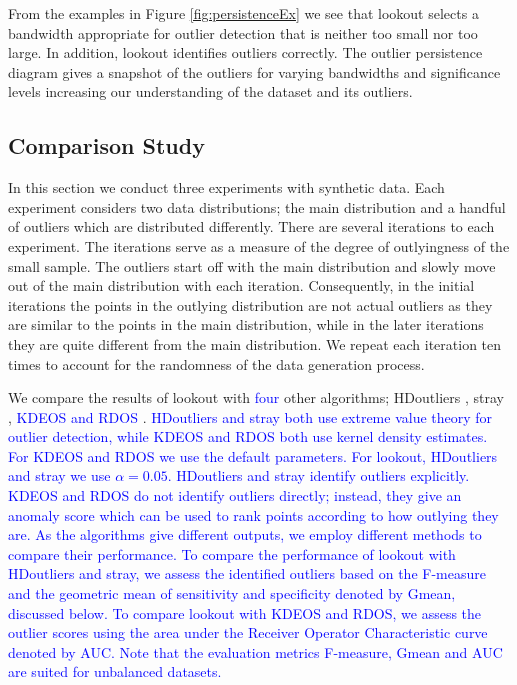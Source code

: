 \documentclass[12pt]{article}
\theoremstyle{definition}
\theoremstyle{definition}
\theoremstyle{definition}
\theoremstyle{definition}
\theoremstyle{remark}
\begin{document}
From the examples in Figure \ref{fig:persistenceEx} we see that lookout selects a bandwidth appropriate for outlier detection that is neither too small nor too large. In addition, lookout identifies outliers correctly. The outlier persistence diagram gives a snapshot of the outliers for varying bandwidths and significance levels increasing our understanding of the dataset and its outliers.

\hypertarget{sec:SyntheticComparison}{%
\subsection{Comparison Study}\label{sec:SyntheticComparison}}

In this section we conduct three experiments with synthetic data. Each experiment considers two data distributions; the main distribution and a handful of outliers which are distributed differently. There are several iterations to each experiment. The iterations serve as a measure of the degree of outlyingness of the small sample. The outliers start off with the main distribution and slowly move out of the main distribution with each iteration. Consequently, in the initial iterations the points in the outlying distribution are not actual outliers as they are similar to the points in the main distribution, while in the later iterations they are quite different from the main distribution. We repeat each iteration ten times to account for the randomness of the data generation process.

We compare the results of lookout with \textcolor{blue}{four} other algorithms; HDoutliers \citep{wilkinson2017visualizing}, stray \citep{stray}, \textcolor{blue}{KDEOS} \citep{Schubert2014} \textcolor{blue}{ and RDOS} \citep{Tang2017}. \textcolor{blue}{HDoutliers and stray both use extreme value theory for outlier detection, while KDEOS and RDOS both use kernel density estimates. For KDEOS and RDOS we use the default parameters. For lookout, HDoutliers and stray we use $\alpha = 0.05$. HDoutliers and stray identify outliers explicitly. KDEOS and RDOS do not identify outliers directly; instead, they give an anomaly score which can be used to rank points according to how outlying they are. As the algorithms give different outputs, we employ different methods to compare their performance. To compare the performance of lookout with HDoutliers and stray, we assess the identified outliers based on the F-measure and the geometric mean of sensitivity and specificity denoted by Gmean, discussed below. To compare lookout with KDEOS and RDOS, we assess the outlier scores using the area under the Receiver Operator Characteristic curve denoted by AUC. Note that the evaluation metrics F-measure, Gmean and AUC are suited for unbalanced datasets.}
\end{document}
